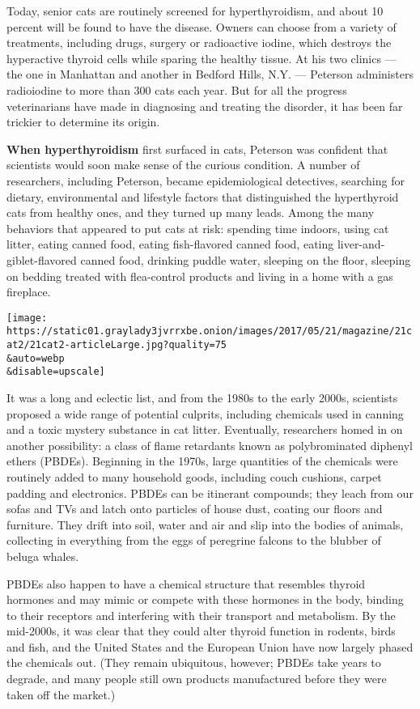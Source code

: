 Today, senior cats are routinely screened for hyperthyroidism, and about
10 percent will be found to have the disease. Owners can choose from a
variety of treatments, including drugs, surgery or radioactive iodine,
which destroys the hyperactive thyroid cells while sparing the healthy
tissue. At his two clinics --- the one in Manhattan and another in
Bedford Hills, N.Y. --- Peterson administers radioiodine to more than
300 cats each year. But for all the progress veterinarians have made in
diagnosing and treating the disorder, it has been far trickier to
determine its origin.

\textbf{When hyperthyroidism} first surfaced in cats, Peterson was
confident that scientists would soon make sense of the curious
condition. A number of researchers, including Peterson, became
epidemiological detectives, searching for dietary, environmental and
lifestyle factors that distinguished the hyperthyroid cats from healthy
ones, and they turned up many leads. Among the many behaviors that
appeared to put cats at risk: spending time indoors, using cat litter,
eating canned food, eating fish-flavored canned food, eating
liver-and-giblet-flavored canned food, drinking puddle water, sleeping
on the floor, sleeping on bedding treated with flea-control products and
living in a home with a gas fireplace.

\texttt{[image: https://static01.graylady3jvrrxbe.onion/images/2017/05/21/magazine/21cat2/21cat2-articleLarge.jpg?quality=75\\\&auto=webp\\\&disable=upscale]}

It was a long and eclectic list, and from the 1980s to the early 2000s,
scientists proposed a wide range of potential culprits, including
chemicals used in canning and a toxic mystery substance in cat litter.
Eventually, researchers homed in on another possibility: a class of
flame retardants known as polybrominated diphenyl ethers (PBDEs).
Beginning in the 1970s, large quantities of the chemicals were routinely
added to many household goods, including couch cushions, carpet padding
and electronics. PBDEs can be itinerant compounds; they leach from our
sofas and TVs and latch onto particles of house dust, coating our floors
and furniture. They drift into soil, water and air and slip into the
bodies of animals, collecting in everything from the eggs of peregrine
falcons to the blubber of beluga whales.

PBDEs also happen to have a chemical structure that resembles thyroid
hormones and may mimic or compete with these hormones in the body,
binding to their receptors and interfering with their transport and
metabolism. By the mid-2000s, it was clear that they could alter thyroid
function in rodents, birds and fish, and the United States and the
European Union have now largely phased the chemicals out. (They remain
ubiquitous, however; PBDEs take years to degrade, and many people still
own products manufactured before they were taken off the market.)

